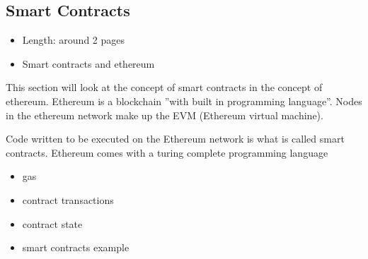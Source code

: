 \subsection{Smart Contracts}

\begin{itemize}
  \item Length: around 2 pages
  \item Smart contracts and ethereum
\end{itemize}

This section will look at the concept of smart contracts in the concept of ethereum.
Ethereum is a blockchain ''with built in programming language''. Nodes in the ethereum network make up the EVM (Ethereum virtual machine).

Code written to be executed on the Ethereum network is what is called smart contracts.
Ethereum comes with a turing complete programming language

\begin{itemize}
  \item gas
  \item contract transactions
  \item contract state  
  \item smart contracts example
\end{itemize}
